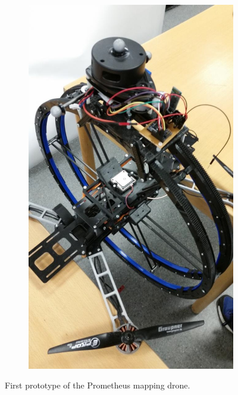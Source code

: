 \begin{figure}[h]
\begin{subfigure}[t]{0.49\textwidth}
		\includegraphics[scale = 0.25]{images/prometheus3.jpg}
		\label{subfig:prometheus4}
	\end{subfigure}
	\caption{First prototype of the Prometheus mapping drone.}
	\label{fig:prometheus}
\end{figure}

